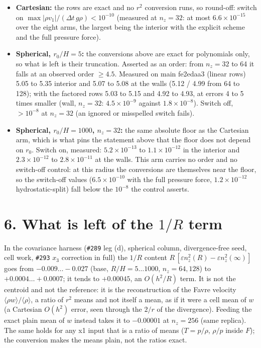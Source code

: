 \documentclass[11pt,a4paper]{article}
\begin{document}
\begin{itemize}
\item \textbf{Cartesian:} the rows are exact and no $r^2$ conversion runs, so round-off: switch on
  $\max|\rho v_1|/(\Delta t\,g\rho) < 10^{-10}$ (measured at $n_z = 32$: at most $6.6\times10^{-15}$ over the
  eight arms, the largest being the interior with the explicit scheme and the full pressure force).
\item \textbf{Spherical, $r_0/H = 5$:} the conversions above are exact for polynomials only, so what is left is their
  truncation. Asserted as an order: from $n_z = 32$ to 64 it falls at an observed order $\ge 4.5$. Measured
  on main fe2edaa3 (linear rows) 5.05 to 5.35 interior and 5.07 to 5.08 at the walls (5.12 / 4.99 from 64 to
  128); with the factored rows 5.03 to 5.15 and 4.92 to 4.93, at errors 4 to 5 times smaller (wall, $n_z = 32$:
  $4.5\times10^{-9}$ against $1.8\times10^{-8}$). Switch off, $> 10^{-8}$ at $n_z = 32$ (an ignored or misspelled
  switch fails).
\item \textbf{Spherical, $r_0/H = 1000$, $n_z = 32$:} the same absolute floor as the Cartesian arm, which is what pins
  the statement above that the floor does not depend on $r_0$. Switch on, measured: $5.2\times10^{-13}$ to
  $1.1\times10^{-12}$ in the interior and $2.3\times10^{-12}$ to $2.8\times10^{-11}$ at the walls. This arm
  carries no order and no switch-off control: at this radius the conversions are themselves near the floor, so
  the switch-off values ($6.5\times10^{-10}$ with the full pressure force, $1.2\times10^{-12}$ hydrostatic-split)
  fall below the $10^{-8}$ the control asserts.
\end{itemize}

\section*{6. What is left of the $1/R$ term}

In the covariance harness (\texttt{\#289} leg (d), spherical column, divergence-free seed, cell work, \texttt{\#293} $x_3$
correction in full) the $1/R$ content $R\,[\varepsilon n_z^2(R) - \varepsilon n_z^2(\infty)]$ goes from
$-0.009 \ldots -0.027$ (base, $R/H = 5 \ldots 1000$, $n_z = 64, 128$) to $+0.0004 \ldots +0.0007$; it tends to
$+0.00045$, an $O(h^2/R)$ term. It is not the centroid and not the reference: it is the reconstruction of
the Favre velocity $\langle\rho w\rangle/\langle\rho\rangle$, a ratio of $r^2$ means and not itself a mean, as if
it were a cell mean of $w$ (a Cartesian $O(h^2)$ error, seen through the $2/r$ of the divergence). Feeding the
exact plain mean of $w$ instead takes it to $-0.00001$ at $n_z = 256$ (same replica). The
same holds for any x1 input that is a ratio of means ($T = p/\rho$, $\rho/p$ inside $F$); the conversion makes
the means plain, not the ratios exact.
\end{document}
